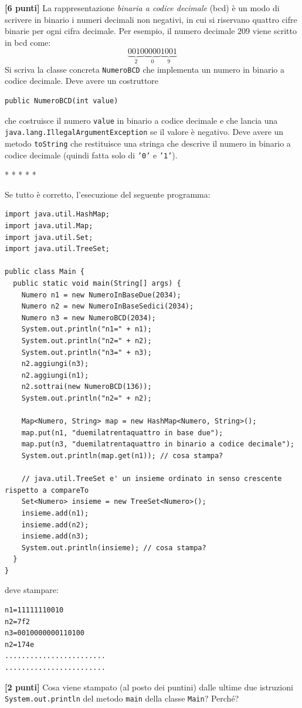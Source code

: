 \documentclass{article}[10pt]
\newcounter{esnu}
\newenvironment{esercizio}{\medskip \noindent {\bf Esercizio\addtocounter{esnu}{1} \arabic{esnu}}}{}
\begin{document}
\begin{esercizio}
\textbf{[6 punti]}
La rappresentazione \emph{binaria a codice decimale} (bcd) \`e un modo di scrivere in
binario i numeri decimali non negativi, in cui si riservano quattro cifre binarie per ogni cifra
decimale. Per esempio, il numero decimale $209$ viene scritto in bcd come:
\[
  \underbrace{0010}_2\underbrace{0000}_0\underbrace{1001}_9
\]
Si scriva la classe concreta \texttt{NumeroBCD} che implementa un numero in
binario a codice decimale. Deve avere un costruttore
{\small
\begin{verbatim}
public NumeroBCD(int value)
\end{verbatim}
}

\noindent
che costruisce il numero \texttt{value} in binario a codice decimale e che lancia una
\texttt{java.lang.IllegalArgumentException} se il valore \`e negativo.
Deve avere un metodo \texttt{toString} che restituisce una stringa che descrive
il numero in binario a codice decimale (quindi fatta solo di \texttt{'0'} e \texttt{'1'}).
\end{esercizio}

\begin{center}
* * * * *
\end{center}

Se tutto \`e corretto, l'esecuzione del seguente programma:
%
{\small
\begin{verbatim}
import java.util.HashMap;
import java.util.Map;
import java.util.Set;
import java.util.TreeSet;

public class Main {
  public static void main(String[] args) {
    Numero n1 = new NumeroInBaseDue(2034);
    Numero n2 = new NumeroInBaseSedici(2034);
    Numero n3 = new NumeroBCD(2034);
    System.out.println("n1=" + n1);
    System.out.println("n2=" + n2);
    System.out.println("n3=" + n3);
    n2.aggiungi(n3);
    n2.aggiungi(n1);
    n2.sottrai(new NumeroBCD(136));
    System.out.println("n2=" + n2);

    Map<Numero, String> map = new HashMap<Numero, String>();
    map.put(n1, "duemilatrentaquattro in base due");
    map.put(n3, "duemilatrentaquattro in binario a codice decimale");
    System.out.println(map.get(n1)); // cosa stampa?

    // java.util.TreeSet e' un insieme ordinato in senso crescente rispetto a compareTo
    Set<Numero> insieme = new TreeSet<Numero>();
    insieme.add(n1);
    insieme.add(n2);
    insieme.add(n3); 
    System.out.println(insieme); // cosa stampa?
  }
}
\end{verbatim}
}

\noindent
deve stampare:
%
{\small
\begin{verbatim}
n1=11111110010
n2=7f2
n3=0010000000110100
n2=174e
........................
........................
\end{verbatim}
}

\begin{esercizio}
\textbf{[2 punti]}
Cosa viene stampato (al posto dei puntini) dalle ultime due istruzioni
\texttt{System.out.println} del metodo \texttt{main} della classe \texttt{Main}?
Perch\'e?
\end{esercizio}
\end{document}
